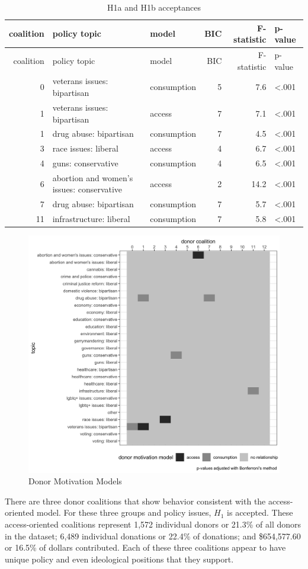 \documentclass[12pt,]{article}
\begin{document}
\begin{longtable}[]{@{}rllrrl@{}}
\caption{H1a and H1b acceptances}\tabularnewline
\toprule
coalition & policy topic & model & BIC & F-statistic &
p-value\tabularnewline
\midrule
\endfirsthead
\toprule
coalition & policy topic & model & BIC & F-statistic &
p-value\tabularnewline
\midrule
\endhead
0 & veterans issues: bipartisan & consumption & 5 & 7.6 &
\textless.001\tabularnewline
1 & veterans issues: bipartisan & access & 7 & 7.1 &
\textless.001\tabularnewline
1 & drug abuse: bipartisan & consumption & 7 & 4.5 &
\textless.001\tabularnewline
3 & race issues: liberal & access & 4 & 6.7 &
\textless.001\tabularnewline
4 & guns: conservative & consumption & 4 & 6.5 &
\textless.001\tabularnewline
6 & abortion and women's issues: conservative & access & 2 & 14.2 &
\textless.001\tabularnewline
7 & drug abuse: bipartisan & consumption & 7 & 5.7 &
\textless.001\tabularnewline
11 & infrastructure: liberal & consumption & 7 & 5.8 &
\textless.001\tabularnewline
\bottomrule
\end{longtable}

\begin{figure}
\centering
\includegraphics{../tables_and_figures/fig_2.jpg}
\caption{Donor Motivation Models}
\end{figure}

There are three donor coalitions that show behavior consistent with the
access-oriented model. For these three groups and policy issues,
\(H_{1}\) is accepted. These access-oriented coalitions represent 1,572
individual donors or 21.3\% of all donors in the dataset; 6,489
individual donations or 22.4\% of donations; and \$654,577.60 or 16.5\%
of dollars contributed. Each of these three coalitions appear to have
unique policy and even ideological positions that they support.
\end{document}
